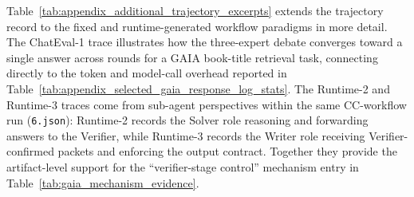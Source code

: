 Table~\ref{tab:appendix_additional_trajectory_excerpts} extends the trajectory record to the fixed and runtime-generated workflow paradigms in more detail. The ChatEval-1 trace illustrates how the three-expert debate converges toward a single answer across rounds for a GAIA book-title retrieval task, connecting directly to the token and model-call overhead reported in Table~\ref{tab:appendix_selected_gaia_response_log_stats}. The Runtime-2 and Runtime-3 traces come from sub-agent perspectives within the same CC-workflow run (\texttt{6.json}): Runtime-2 records the Solver role reasoning and forwarding answers to the Verifier, while Runtime-3 records the Writer role receiving Verifier-confirmed packets and enforcing the output contract. Together they provide the artifact-level support for the ``verifier-stage control'' mechanism entry in Table~\ref{tab:gaia_mechanism_evidence}.

